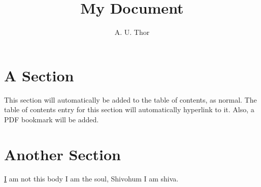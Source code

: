 \documentclass{article}
\title{My Document}
\author{A. U. Thor}
\begin{document}
\maketitle
\tableofcontents

\section{A Section}\label{sec:hello}
This section will automatically be added to the table of contents, as normal. The table of
contents entry for this section will automatically hyperlink to it. Also, a PDF bookmark
will be added.

\section{Another Section}\hyperref[sec:hello]
I am not this body I am the soul, Shivohum I am shiva.
\end{document}
